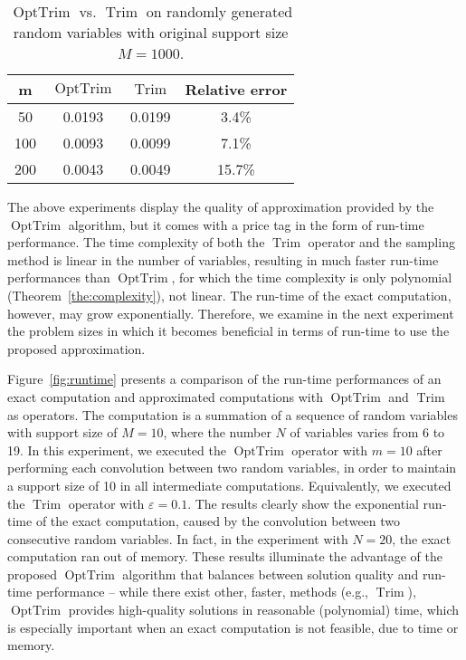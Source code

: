\documentclass{article}
\DeclareMathOperator{\Trim}{Trim}
\DeclareMathOperator{\OptTrim}{OptTrim}
\begin{document}
\begin{table}[tbp]
	\scriptsize
	\centering
	\begin{tabular}{|c|c|c|c|}
		\hline
		m   & $\OptTrim$	& $\Trim$	& Relative error  \\ \hline
		50  & 0.0193			& 0.0199	& 3.4\%            \\ \hline
		100 & 0.0093			& 0.0099	& 7.1\%            \\ \hline
		200 & 0.0043			& 0.0049	& 15.7\%           \\ \hline
	\end{tabular}
	\caption{$\OptTrim$ vs. $\Trim$ on randomly generated random variables with original support size $M=1000$.}
	\label{tab:trimvsoptrim2}
\end{table}

The above experiments display the quality of approximation provided by the $\OptTrim$ algorithm, but it comes with a price tag in the form of run-time performance. The time complexity of both the $\Trim$ operator and the sampling method is linear in the number of variables, resulting in much faster run-time performances than $\OptTrim$, for which the time complexity is only polynomial (Theorem~\ref{the:complexity}), not linear. The run-time of the exact computation, however,  may grow exponentially. Therefore, we examine in the next experiment the problem sizes in which it becomes beneficial in terms of run-time to use the proposed approximation.

Figure~\ref{fig:runtime} presents a comparison of the run-time performances of an exact computation and approximated computations with $\OptTrim$ and $\Trim$ as operators. The computation is a summation of a sequence of random variables with support size of $M{=}10$, where the number $N$ of variables varies from 6 to 19. In this experiment, we executed the $\OptTrim$ operator with $m{=}10$ after performing each convolution between two random variables, in order to maintain a support size of 10 in all intermediate computations. 
Equivalently, we executed the $\Trim$ operator with $\varepsilon=0.1$.
The results clearly show the exponential run-time of the exact computation, caused by the convolution between two consecutive random variables. In fact, in the experiment with $N{=}20$, the exact computation ran out of memory. These results illuminate the advantage of the proposed $\OptTrim$ algorithm that balances between solution quality and run-time performance -- while there exist other, faster, methods (e.g., $\Trim$), $\OptTrim$ provides high-quality solutions in reasonable (polynomial) time, which is especially important when an exact computation is not feasible, due to time or memory.
\end{document}
